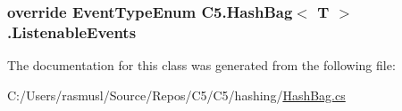 \subsubsection[{Listenable\+Events}]{\setlength{\rightskip}{0pt plus 5cm}override {\bf Event\+Type\+Enum} {\bf C5.\+Hash\+Bag}$<$ T $>$.Listenable\+Events\hspace{0.3cm}{\ttfamily [get]}}\label{class_c5_1_1_hash_bag_a676d1112960f86055de24540992f6310}






The documentation for this class was generated from the following file\+:\begin{DoxyCompactItemize}
\item 
C\+:/\+Users/rasmusl/\+Source/\+Repos/\+C5/\+C5/hashing/\hyperlink{_hash_bag_8cs}{Hash\+Bag.\+cs}\end{DoxyCompactItemize}
